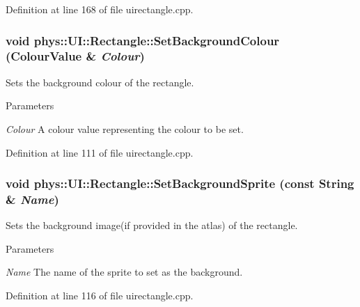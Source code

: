 Definition at line 168 of file uirectangle.cpp.

\hypertarget{classphys_1_1UI_1_1Rectangle_ac777c61b1019c3a679bc121e533e2799}{
\subsubsection[{SetBackgroundColour}]{\setlength{\rightskip}{0pt plus 5cm}void phys::UI::Rectangle::SetBackgroundColour ({\bf ColourValue} \& {\em Colour})}}
\label{d1/d5d/classphys_1_1UI_1_1Rectangle_ac777c61b1019c3a679bc121e533e2799}


Sets the background colour of the rectangle. 


\begin{DoxyParams}{Parameters}
\item[{\em Colour}]A colour value representing the colour to be set. \end{DoxyParams}


Definition at line 111 of file uirectangle.cpp.

\hypertarget{classphys_1_1UI_1_1Rectangle_ae9cc47125e075aaa9bfd397762de6e0c}{
\subsubsection[{SetBackgroundSprite}]{\setlength{\rightskip}{0pt plus 5cm}void phys::UI::Rectangle::SetBackgroundSprite (const {\bf String} \& {\em Name})}}
\label{d1/d5d/classphys_1_1UI_1_1Rectangle_ae9cc47125e075aaa9bfd397762de6e0c}


Sets the background image(if provided in the atlas) of the rectangle. 


\begin{DoxyParams}{Parameters}
\item[{\em Name}]The name of the sprite to set as the background. \end{DoxyParams}


Definition at line 116 of file uirectangle.cpp.

